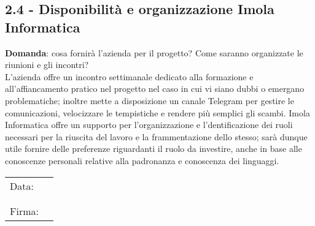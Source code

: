 \documentclass[italian,12pt]{article} %
\begin{document}
\begin{flushleft}
\subsection*{2.4 - Disponibilità e organizzazione Imola Informatica}
	\textbf{Domanda}: cosa fornirà l'azienda per il progetto? Come saranno organizzate le riunioni e gli incontri?\\
	L’azienda offre un incontro settimanale dedicato alla formazione e all’affiancamento pratico nel progetto nel caso in cui vi 
	siano dubbi o emergano problematiche; inoltre mette a disposizione un canale Telegram per gestire le comunicazioni, velocizzare le tempistiche e rendere più semplici gli scambi. Imola Informatica offre un supporto per 
	l’organizzazione e l’dentificazione dei ruoli necessari per la riuscita del lavoro e la frammentazione dello stesso; 
	sarà dunque utile fornire delle preferenze riguardanti il ruolo da investire, anche in base alle conoscenze personali 
	relative alla padronanza e conoscenza dei linguaggi.
	
\end{flushleft}


\begin{table}[b]
\begin{tabular}{@{}p{.5in}p{4in}@{}}
	Data:  & \hrulefill \\
		   &     		\\
		   &     		\\
	Firma: & \hrulefill \\
\end{tabular}
\end{table}
	
\end{document}
